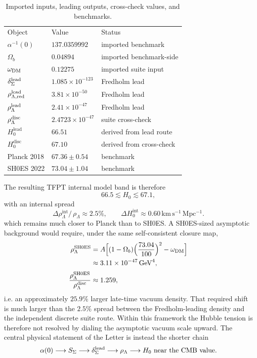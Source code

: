 \begin{table}[b]
\small
\caption{Imported inputs, leading outputs, cross-check values, and benchmarks.}
\begin{ruledtabular}
\begin{tabular}{lll}
Object & Value & Status \\
$\alpha^{-1}(0)$ & $137.0359992$ & imported benchmark \\
$\Omega_b$ & $0.04894$ & imported benchmark-side \\
$\omega_{\mathrm{DM}}$ & $0.12275$ & imported suite input \\
$\delta_{\Sigma}^{\mathrm{lead}}$ & $1.085\times10^{-123}$ & Fredholm lead \\
$\rho_{\Lambda,\mathrm{red}}^{\mathrm{lead}}$ & $3.81\times10^{-50}$ & Fredholm lead \\
$\rho_{\Lambda}^{\mathrm{lead}}$ & $2.41\times10^{-47}$ & Fredholm lead \\
$\rho_{\Lambda}^{\mathrm{disc}}$ & $2.4723\times10^{-47}$ & suite cross-check \\
$H_0^{\mathrm{lead}}$ & $66.51$ & derived from lead route \\
$H_0^{\mathrm{disc}}$ & $67.10$ & derived from cross-check \\
Planck 2018 & $67.36\pm0.54$ & benchmark \\
SH0ES 2022 & $73.04\pm1.04$ & benchmark \\
\end{tabular}
\end{ruledtabular}
\label{tab:claim-surface}
\end{table}

The resulting TFPT internal model band is therefore
\[
66.5 \lesssim H_0 \lesssim 67.1,
\]
with an internal spread
\[
\Delta\rho_\Lambda^{\mathrm{int}}\!/\,\rho_\Lambda
\approx 2.5\%,
\qquad
\Delta H_0^{\mathrm{int}}
\approx 0.60\,\mathrm{km\,s^{-1}\,Mpc^{-1}}.
\]
which remains much closer to Planck than to SH0ES. A SH0ES-sized asymptotic background would require, under the same self-consistent closure map,
\begin{equation}
\begin{aligned}
\rho_{\Lambda}^{\mathrm{SH0ES}}
&=
A\Bigl[(1-\Omega_b)\Bigl(\frac{73.04}{100}\Bigr)^2-\omega_{\mathrm{DM}}\Bigr]\\
&\approx
3.11\times10^{-47}\,\mathrm{GeV}^4,\\[2pt]
\frac{\rho_{\Lambda}^{\mathrm{SH0ES}}}{\rho_{\Lambda}^{\mathrm{disc}}}
&\approx
1.259,
\end{aligned}
\label{eq:sh0es-ratio}
\end{equation}
i.e. an approximately $25.9\%$ larger late-time vacuum density. That required shift is much larger than the $2.5\%$ spread between the Fredholm-leading density and the independent discrete suite route. Within this framework the Hubble tension is therefore not resolved by dialing the asymptotic vacuum scale upward. The central physical statement of the Letter is instead the shorter chain
\[
\alpha(0)
\longrightarrow
S_{\Sigma}
\longrightarrow
\delta_{\Sigma}^{\mathrm{lead}}
\longrightarrow
\rho_{\Lambda}
\longrightarrow
H_0 \ \text{near the CMB value}.
\]

